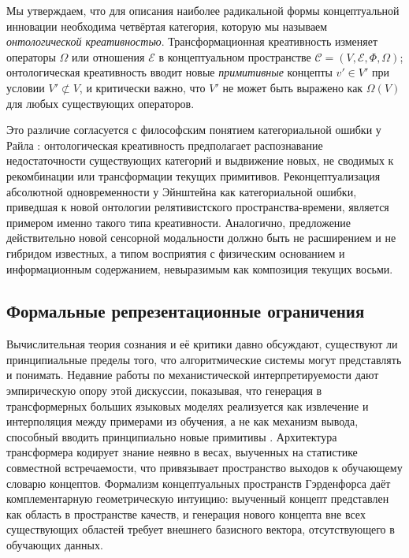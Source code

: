 \documentclass[sn-mathphys-num]{sn-jnl}
\begin{document}
Мы утверждаем, что для описания наиболее радикальной формы концептуальной инновации необходима четвёртая категория, которую мы называем \emph{онтологической креативностью}. Трансформационная креативность изменяет операторы $\Omega$ или отношения $\mathcal{E}$ в концептуальном пространстве $\mathcal{C} = (V, \mathcal{E}, \Phi, \Omega)$; онтологическая креативность вводит новые \emph{примитивные} концепты $v' \in V'$ при условии $V' \not\subset V$, и критически важно, что $V'$ не может быть выражено как $\Omega(V)$ для любых существующих операторов.

Это различие согласуется с философским понятием категориальной ошибки у Райла \cite{ryle1949concept}: онтологическая креативность предполагает распознавание недостаточности существующих категорий и выдвижение новых, не сводимых к рекомбинации или трансформации текущих примитивов. Реконцептуализация абсолютной одновременности у Эйнштейна как категориальной ошибки, приведшая к новой онтологии релятивистского пространства-времени, является примером именно такого типа креативности. Аналогично, предложение действительно новой сенсорной модальности должно быть не расширением и не гибридом известных, а типом восприятия с физическим основанием и информационным содержанием, невыразимым как композиция текущих восьми.

\subsection{Формальные репрезентационные ограничения}

Вычислительная теория сознания \cite{turing1936computable,godel1931formal} и её критики \cite{searle1980minds,penrose1990emperors,dreyfus1972computers} давно обсуждают, существуют ли принципиальные пределы того, что алгоритмические системы могут представлять и понимать. Недавние работы по механистической интерпретируемости дают эмпирическую опору этой дискуссии, показывая, что генерация в трансформерных больших языковых моделях реализуется как извлечение и интерполяция между примерами из обучения, а не как механизм вывода, способный вводить принципиально новые примитивы \cite{brown2020language,elhage2021mathematical}. Архитектура трансформера \cite{vaswani2017attention} кодирует знание неявно в весах, выученных на статистике совместной встречаемости, что привязывает пространство выходов к обучающему словарю концептов. Формализм концептуальных пространств Гэрденфорса \cite{gardenfors2000conceptual} даёт комплементарную геометрическую интуицию: выученный концепт представлен как область в пространстве качеств, и генерация нового концепта вне всех существующих областей требует внешнего базисного вектора, отсутствующего в обучающих данных.
\end{document}
